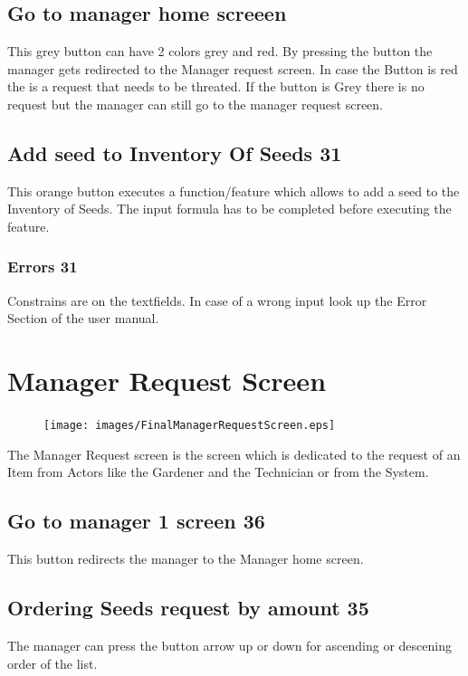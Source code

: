 \subsection{Go to manager home screeen}
This grey button can have 2 colors grey and red. By pressing the button the
manager gets redirected to the Manager request screen. In case the Button is red
the is a request that needs to be threated. If the button is Grey there is no
request but the manager can still go to the manager request screen.

\subsection{Add seed to Inventory Of Seeds 31}
This orange button executes a function/feature which allows to add a seed to 
the Inventory of Seeds. The input formula has to be completed before executing
the feature.


\subsubsection{Errors 31}
Constrains are on the textfields. In case of a wrong input look up the Error
Section of the user manual.





\section{Manager Request Screen}
\label{sec:appendix_Manager_Request_Screen}

\begin{figure}[H]
\texttt{[image: images/FinalManagerRequestScreen.eps]}
\end{figure}

The Manager Request screen is the screen which is dedicated to the request of an
Item from  Actors like the Gardener and the Technician or from the System. 


\subsection{Go to manager 1 screen 36}
This button redirects the manager to the Manager home screen.

\subsection{Ordering Seeds request by amount 35}
The manager can press the button arrow up or down for ascending or descening
order of the list.

